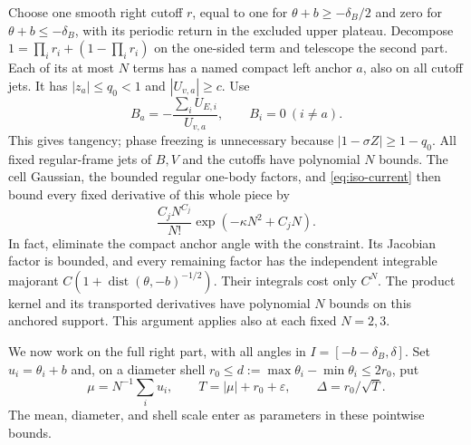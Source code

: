 \documentclass[11pt]{article}
\numberwithin{equation}{section}
\theoremstyle{definition}
\newcommand{\eps}{\varepsilon}
\begin{document}
Choose one smooth right cutoff $r$, equal to one for
$\theta+b\ge-\delta_B/2$ and zero for $\theta+b\le-\delta_B$,
with its periodic return in the excluded upper plateau.  Decompose
$1=\prod_i r_i+(1-\prod_i r_i)$ on the one-sided term and telescope
the second part.  Each of its at most $N$ terms has a named compact
left anchor $a$, also on all cutoff jets.  It has
$|z_a|\le q_0<1$ and $|U_{v,a}|\ge c$.  Use
\begin{equation}\label{eq:iso-anchor-field}
 B_a=-\frac{\sum_iU_{{E},i}}{U_{v,a}},\qquad B_i=0\ (i\ne a).
\end{equation}
This gives tangency; phase freezing is unnecessary because
$|1-\sigma Z|\ge1-q_0$.  All fixed regular-frame jets of $B,V$ and
the cutoffs have polynomial $N$ bounds.  The cell Gaussian, the
bounded regular one-body factors, and \eqref{eq:iso-current} then
bound every fixed derivative of this whole piece by
\begin{equation}\label{eq:iso-anchor-bound}
 \frac{C_jN^{C_j}}{N!}\exp(-\kappa N^2+C_jN).
\end{equation}
In fact, eliminate the compact anchor angle with the constraint.
Its Jacobian factor is bounded, and every remaining factor has the
independent integrable majorant
$C(1+\operatorname{dist}(\theta,-b)^{-1/2})$.
Their integrals cost only $C^N$.  The product kernel and its
transported derivatives have polynomial $N$ bounds on this anchored
support.  This argument applies also at each fixed $N=2,3$.

We now work on the full right part, with all angles in
$I=[-b-\delta_B,\delta]$.  Set $u_i=\theta_i+b$ and, on a diameter
shell $r_0\le d:=\max\theta_i-\min\theta_i\le2r_0$, put
\begin{equation}\label{eq:iso-scales}
 \mu=N^{-1}\sum_i u_i,\qquad
 T=|\mu|+r_0+\eps,\qquad \Delta=r_0/\sqrt T.
\end{equation}
The mean, diameter, and shell scale enter as parameters in these
pointwise bounds.
\end{document}
